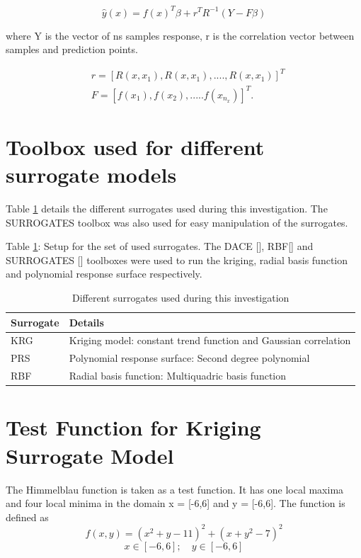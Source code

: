 \begin{equation}
\hat{y}(x) = f(x)^{T} \beta + r^{T} R^{-1} (Y - F \beta )
\end{equation}

where Y is the vector of ns samples response, r is the correlation vector between samples and prediction points.


\begin{eqnarray}
& r = [R(x,x_{1}),R(x,x_{1}),....,R(x,x_{1}) ]^{T} \\
& F = [f(x_{1}), f(x_{2}),.....f(x_{n_{x}}) ]^{T} .
\end{eqnarray}

\section{Toolbox used for different surrogate models}

Table \ref{Different surrogates used during this investigation} details the different surrogates used during this investigation. The SURROGATES toolbox was also used for easy manipulation of the surrogates.

Table \ref{Different surrogates used during this investigation}: Setup for the set of used surrogates. The  DACE [], RBF[] and SURROGATES [] toolboxes were used to run the kriging, radial basis function and polynomial response surface respectively.

\begin{table}[H]
	\centering
	\caption{Different surrogates used during this investigation}
	\label{Different surrogates used during this investigation}
	\begin{tabular}{ll}
		\hline \hline
		Surrogate & Details    \\ \hline \hline
		KRG	 & Kriging model: constant trend function and Gaussian correlation \\
		PRS & Polynomial response surface: Second degree polynomial \\
		RBF  & Radial basis function: Multiquadric basis function \\
		\hline \hline
	\end{tabular}
\end{table}


\section{Test Function for Kriging Surrogate Model}
\label{test function}
The Himmelblau function is taken as a test function.  It has one local maxima and four local minima in the domain x = [-6,6] and y = [-6,6]. The function is defined as 
\begin{equation}
f(x,y) = (x^2 + y - 11)^2  + (x + y^2 - 7)^2 
\end{equation}
\begin{equation}
x \in [-6,6] ;\quad y \in [-6,6]
\end{equation}

